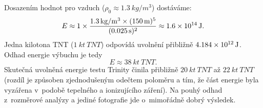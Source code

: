 \begin{priklad}
    Dosazením hodnot pro vzduch ($\rho_0 \approx \qty{1.3}{kg/m^3}$) dostáváme:
    $$ E \approx 1 \times \frac{\qty{1.3}{kg/m^3} \times (\qty{150}{m})^5}{(\qty{0.025}{s})^2} \approx \qty{1.6d14}{J}. $$
    Jedna kilotona TNT ($1\ \unit{kt\ TNT}$) odpovídá uvolnění přibližně $\qty{4.184d12}{J}$. Odhad energie výbuchu je tedy
    $$ E \approx \qty{38}{kt\ TNT}. $$
    Skutečná uvolněná energie testu Trinity činila přibližně $\qty{20}{kt\ TNT}$ až $\qty{22}{kt\ TNT}$ (rozdíl je způsoben zjednodušeným odečtem poloměru a tím, že část energie byla vyzářena v~podobě tepelného a ionizujícího záření). Na pouhý odhad z~rozměrové analýzy a jediné fotografie jde o~mimořádně dobrý výsledek.
\end{priklad}


